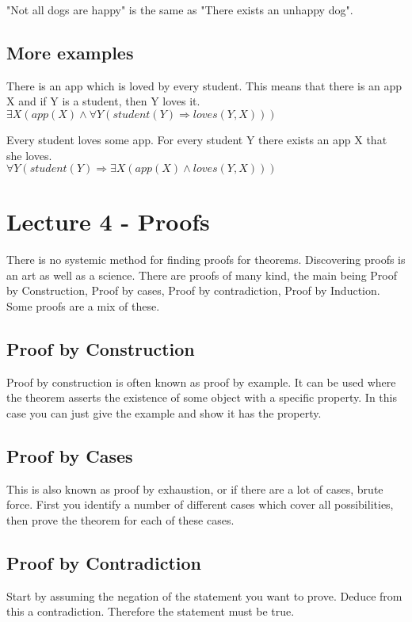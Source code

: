 \documentclass[11pt, oneside]{article}   	%
\begin{document}
"Not all dogs are happy" is the same as "There exists an unhappy dog".

\subsection{More examples}

There is an app which is loved by every student. This means that there is an app X and if Y is a student, then Y loves it.\\
$\exists X (app(X) \wedge \forall Y(student(Y) \Rightarrow loves(Y,X)))$

Every student loves some app. For every student Y there exists an app X that she loves.\\
$\forall Y(student(Y) \Rightarrow \exists X (app(X) \wedge loves(Y,X)))$


\section{Lecture 4 - Proofs}

There is no systemic method for finding proofs for theorems. Discovering proofs is an art as well as a science. There are proofs of many kind, the main being Proof by Construction, Proof by cases, Proof by contradiction, Proof by Induction. Some proofs are a mix of these.

\subsection{Proof by Construction}
Proof by construction is often known as proof by example. It can be used where the theorem asserts the existence of some object with a specific property. In this case you can just give the example and show it has the property.

\subsection{Proof by Cases}

This is also known as proof by exhaustion, or if there are a lot of cases, brute force. First you identify  a number of different cases which cover all possibilities, then prove the theorem for each of these cases. 

\subsection{Proof by Contradiction}

Start by assuming the negation of the statement you want to prove. Deduce from this a contradiction. Therefore the statement must be true.
\end{document}
